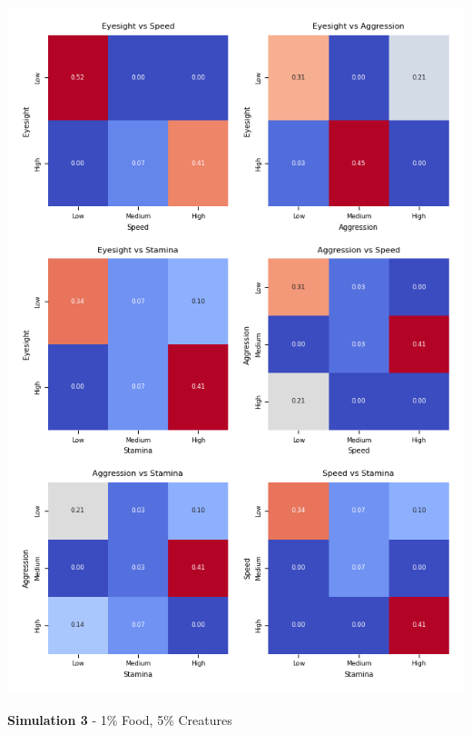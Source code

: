 \documentclass{article}
\begin{document}
\begin{center}
    \includegraphics[scale=0.9]{tests/2.2_confusion_matrices.png}
\end{center}
\textbf{Simulation 3} - 1\% Food, 5\% Creatures
\end{document}
